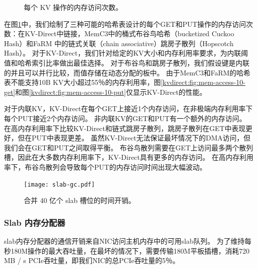 \begin{figure}[t]
\centering
{}

\vfill

\caption{每个 KV 操作的内存访问次数。}
\label{kvdirect:fig:mem-access-tput}

\end{figure}

在图\ref {kvdirect:fig:mem-access-tput}中，我们绘制了三种可能的哈希表设计的每个GET和PUT操作的内存访问次数：在KV-Direct中链接，MemC3中的桶式布谷鸟哈希（bucketized Cuckoo Hash）\cite {fan2013memc3}和FaRM \cite {dragojevic2014farm}中的链式关联（chain associative）跳房子散列（Hopscotch Hash）。
对于KV-Direct，我们针对给定的KV大小和内存利用率要求，为内联阈值和哈希索引比率做出最佳选择。
对于布谷鸟和跳房子散列，我们假设键是内联的并且可以并行比较，而值存储在动态分配的板中。
由于MemC3和FaRM的哈希表不能支持10B KV大小超过55％的内存利用率，图\ref {kvdirect:fig:mem-access-10-get}和图\ref {kvdirect:fig:mem-access-10-put}仅显示KV-Direct的性能。

对于内联KV，KV-Direct在每个GET上接近1个内存访问，在非极端内存利用率下每个PUT接近2个内存访问。
非内联KV的GET和PUT有一个额外的内存访问。
在高内存利用率下比较KV-Direct和链式跳房子散列，跳房子散列在GET中表现更好，但在PUT中表现更差。
虽然KV-Direct无法保证最坏情况下的DMA访问，但我们会在GET和PUT之间取得平衡。
布谷鸟散列需要在GET上访问最多两个散列槽，因此在大多数内存利用率下，KV-Direct具有更多的内存访问。
在高内存利用率下，布谷鸟散列会导致每个PUT的内存访问时间出现大幅波动。


\begin{figure}[t]
\centering
\texttt{[image: slab-gc.pdf]}
\caption{合并 40 亿个 slab 槽位的时间开销。}
\label{kvdirect:fig:slab-garbage-collection}

\end{figure}

\subsubsection{Slab 内存分配器}
\label{kvdirect:sec:slab-eval}

slab内存分配器的通信开销来自NIC访问主机内存中的可用slab队列。
为了维持每秒180M操作的最大吞吐量，在最坏的情况下，需要传输180M平板插槽，消耗720 MB / s PCIe吞吐量，即我们NIC的总PCIe吞吐量的5％。

